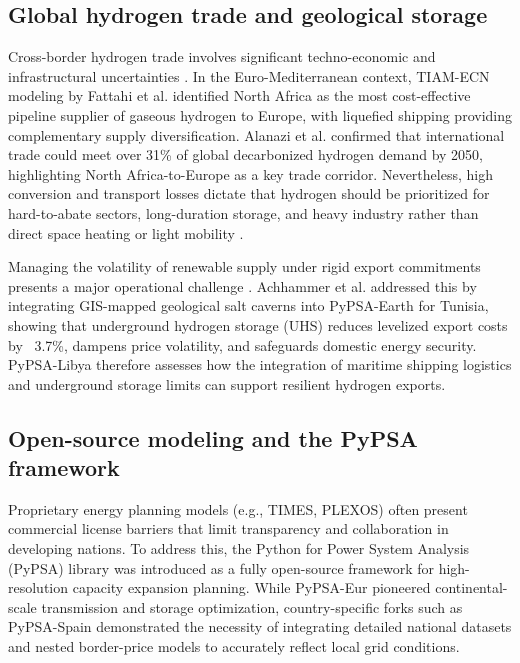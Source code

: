 \documentclass[preprint,12pt]{elsarticle}
\begin{document}
\subsection{Global hydrogen trade and geological storage}
Cross-border hydrogen trade involves significant techno-economic and infrastructural uncertainties \cite{fakhreddine2025global}. In the Euro-Mediterranean context, TIAM-ECN modeling by Fattahi et al. \cite{fattahi2024opportunities} identified North Africa as the most cost-effective pipeline supplier of gaseous hydrogen to Europe, with liquefied shipping providing complementary supply diversification. Alanazi et al. \cite{alanazi2025renewable} confirmed that international trade could meet over 31\% of global decarbonized hydrogen demand by 2050, highlighting North Africa-to-Europe as a key trade corridor. Nevertheless, high conversion and transport losses dictate that hydrogen should be prioritized for hard-to-abate sectors, long-duration storage, and heavy industry rather than direct space heating or light mobility \cite{johnson2025realistic}.

Managing the volatility of renewable supply under rigid export commitments presents a major operational challenge \cite{terlouw2022large}. Achhammer et al. \cite{achhammer2026impact} addressed this by integrating GIS-mapped geological salt caverns into \textsf{PyPSA-Earth} for Tunisia, showing that underground hydrogen storage (UHS) reduces levelized export costs by ~3.7\%, dampens price volatility, and safeguards domestic energy security. \textsf{PyPSA-Libya} therefore assesses how the integration of maritime shipping logistics and underground storage limits can support resilient hydrogen exports.

\subsection{Open-source modeling and the PyPSA framework}
Proprietary energy planning models (e.g., TIMES, PLEXOS) often present commercial license barriers that limit transparency and collaboration in developing nations. To address this, the Python for Power System Analysis (PyPSA) library was introduced as a fully open-source framework for high-resolution capacity expansion planning. While \textsf{PyPSA-Eur} pioneered continental-scale transmission and storage optimization, country-specific forks such as \textsf{PyPSA-Spain} \cite{gallego2025pypsaspain} demonstrated the necessity of integrating detailed national datasets and nested border-price models to accurately reflect local grid conditions.
\end{document}
